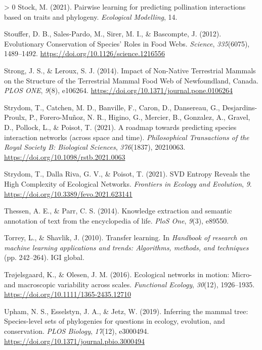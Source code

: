 \documentclass[11pt]{article}
\newlength{\cslhangindent}
\newenvironment{CSLReferences}[3] %
 {%
  \setlength{\parindent}{0pt}
  \ifodd #1 \everypar{\setlength{\hangindent}{\cslhangindent}}\ignorespaces\fi
  \ifnum #2 > 0
  \setlength{\parskip}{#2\baselineskip}
  \fi
 }%
 {}
\begin{document}
\begin{CSLReferences}{1}{0}
\leavevmode\hypertarget{ref-Stock2021PaiLea}{}%
Stock, M. (2021). Pairwise learning for predicting pollination
interactions based on traits and phylogeny. \emph{Ecological Modelling},
14.

\leavevmode\hypertarget{ref-Stouffer2012EvoCon}{}%
Stouffer, D. B., Sales-Pardo, M., Sirer, M. I., \& Bascompte, J. (2012).
Evolutionary Conservation of Species' Roles in Food Webs.
\emph{Science}, \emph{335}(6075), 1489--1492.
\url{https://doi.org/10.1126/science.1216556}

\leavevmode\hypertarget{ref-Strong2014ImpNon}{}%
Strong, J. S., \& Leroux, S. J. (2014). Impact of Non-Native Terrestrial
Mammals on the Structure of the Terrestrial Mammal Food Web of
Newfoundland, Canada. \emph{PLOS ONE}, \emph{9}(8), e106264.
\url{https://doi.org/10.1371/journal.pone.0106264}

\leavevmode\hypertarget{ref-Strydom2021RoaPre}{}%
Strydom, T., Catchen, M. D., Banville, F., Caron, D., Dansereau, G.,
Desjardins-Proulx, P., Forero-Muñoz, N. R., Higino, G., Mercier, B.,
Gonzalez, A., Gravel, D., Pollock, L., \& Poisot, T. (2021). A roadmap
towards predicting species interaction networks (across space and time).
\emph{Philosophical Transactions of the Royal Society B: Biological
Sciences}, \emph{376}(1837), 20210063.
\url{https://doi.org/10.1098/rstb.2021.0063}

\leavevmode\hypertarget{ref-Strydom2021SvdEnt}{}%
Strydom, T., Dalla Riva, G. V., \& Poisot, T. (2021). SVD Entropy
Reveals the High Complexity of Ecological Networks. \emph{Frontiers in
Ecology and Evolution}, \emph{9}.
\url{https://doi.org/10.3389/fevo.2021.623141}

\leavevmode\hypertarget{ref-Thessen2014KnoExt}{}%
Thessen, A. E., \& Parr, C. S. (2014). Knowledge extraction and semantic
annotation of text from the encyclopedia of life. \emph{PloS One},
\emph{9}(3), e89550.

\leavevmode\hypertarget{ref-Torrey2010TraLea}{}%
Torrey, L., \& Shavlik, J. (2010). Transfer learning. In \emph{Handbook
of research on machine learning applications and trends: Algorithms,
methods, and techniques} (pp. 242--264). IGI global.

\leavevmode\hypertarget{ref-Trojelsgaard2016EcoNet}{}%
Trøjelsgaard, K., \& Olesen, J. M. (2016). Ecological networks in
motion: Micro- and macroscopic variability across scales.
\emph{Functional Ecology}, \emph{30}(12), 1926--1935.
\url{https://doi.org/10.1111/1365-2435.12710}

\leavevmode\hypertarget{ref-Upham2019InfMam}{}%
Upham, N. S., Esselstyn, J. A., \& Jetz, W. (2019). Inferring the mammal
tree: Species-level sets of phylogenies for questions in ecology,
evolution, and conservation. \emph{PLOS Biology}, \emph{17}(12),
e3000494. \url{https://doi.org/10.1371/journal.pbio.3000494}


\end{CSLReferences}
\end{document}
